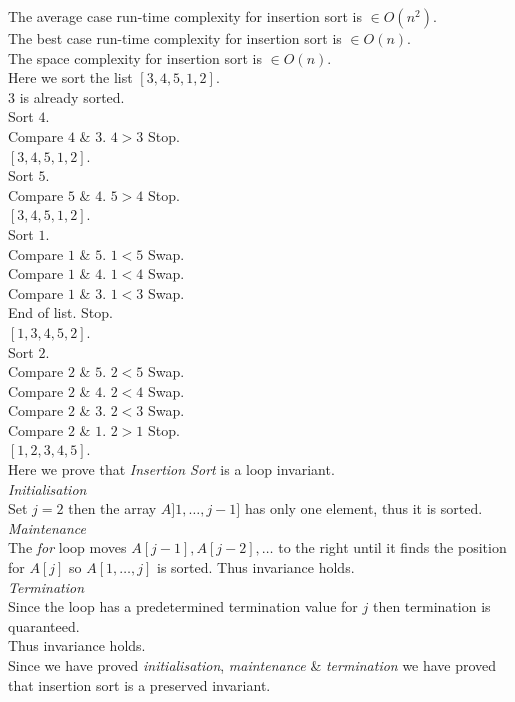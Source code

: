 \documentclass[11pt,a4paper]{article}
\begin{document}
The average case run-time complexity for insertion sort is $\in O(n^2)$.\\
The best case run-time complexity for insertion sort is $\in O(n)$.\\
The space complexity for insertion sort is $\in O(n)$.\\

Here we sort the list $[3,4,5,1,2]$.\\
$3$ is already sorted.\\
Sort $4$.\\
Compare $4$ \& $3$. $4>3$ Stop.\\
$[3,4,5,1,2]$.\\
Sort $5$.\\
Compare $5$ \& $4$. $5>4$ Stop.\\
$[3,4,5,1,2]$.\\
Sort $1$.\\
Compare $1$ \& $5$. $1<5$ Swap.\\
Compare $1$ \& $4$. $1<4$ Swap.\\
Compare $1$ \& $3$. $1<3$ Swap.\\
End of list. Stop.\\
$[1,3,4,5,2]$.\\
Sort $2$.\\
Compare $2$ \& $5$. $2<5$ Swap.\\
Compare $2$ \& $4$. $2<4$ Swap.\\
Compare $2$ \& $3$. $2<3$ Swap.\\
Compare $2$ \& $1$. $2>1$ Stop.\\
$[1,2,3,4,5]$.\\

Here we prove that \textit{Insertion Sort} is a loop invariant.\\
\textit{Initialisation}\\
Set $j=2$ then the array $A]1, \dots, j-1]$ has only one element, thus it is sorted.\\
\textit{Maintenance}\\
The \textit{for} loop moves $A[j-1], A[j-2], \dots$ to the right until it finds the position for $A[j]$ so $A[1, \dots, j]$ is sorted. Thus invariance holds.\\
\textit{Termination}\\
Since the loop has a predetermined termination value for $j$ then termination is quaranteed.\\
Thus invariance holds.\\
Since we have proved \textit{initialisation}, \textit{maintenance} \& \textit{termination} we have proved that insertion sort is a preserved invariant.\\
\end{document}
